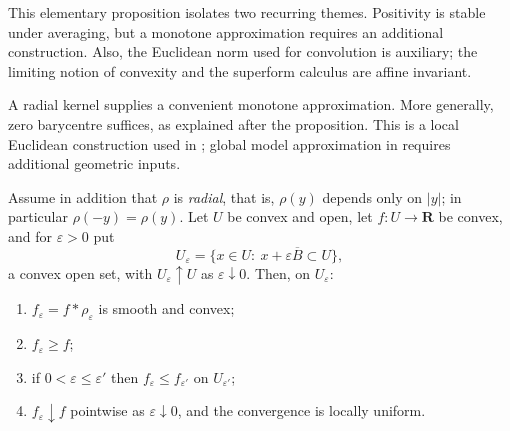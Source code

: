 This elementary proposition isolates two recurring themes.  Positivity is
stable under averaging, but a monotone approximation requires an additional
construction.  Also, the Euclidean norm used for convolution is auxiliary;
the limiting notion of convexity and the superform calculus are affine
invariant.

A radial kernel supplies a convenient monotone approximation.  More
generally, zero barycentre suffices, as explained after the proposition.
This is a local Euclidean construction used in
; global model approximation in
 requires additional geometric inputs.

\begin{proposition}
\label{prop:ch09-radial-mollification}
Assume in addition that $\rho$ is \emph{radial}, that is,
$\rho(y)$ depends only on $|y|$; in particular $\rho(-y)=\rho(y)$.  Let $U$
be convex and open, let $f:U\to\mathbf R$ be convex, and for $\varepsilon>0$
put
\[
 U_\varepsilon=\{x\in U:\ x+\varepsilon\overline B\subset U\},
\]
a convex open set, with $U_\varepsilon\uparrow U$ as
$\varepsilon\downarrow0$.  Then, on $U_\varepsilon$:
\begin{enumerate}
\item $f_\varepsilon=f*\rho_\varepsilon$ is smooth and convex;
\item $f_\varepsilon\geq f$;
\item if $0<\varepsilon\leq\varepsilon'$ then
  $f_\varepsilon\leq f_{\varepsilon'}$ on $U_{\varepsilon'}$;
\item $f_\varepsilon\downarrow f$ pointwise as $\varepsilon\downarrow0$, and
  the convergence is locally uniform.
\end{enumerate}
\end{proposition}

